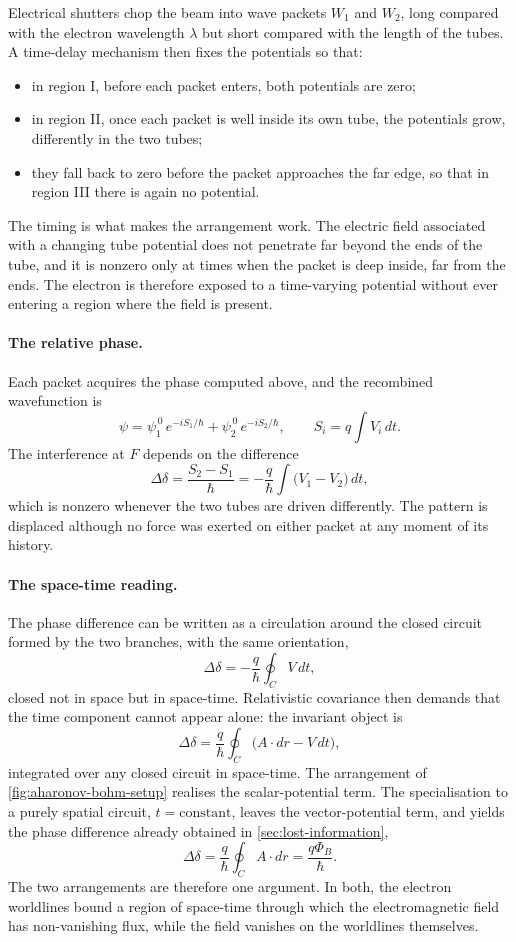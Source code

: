 Electrical shutters chop the beam into wave packets $W_1$ and $W_2$, long
compared with the electron wavelength $\lambda$ but short compared with the
length of the tubes. A time-delay mechanism then fixes the potentials so that:

\begin{itemize}
	\item in region I, before each packet enters, both potentials are zero;
	\item in region II, once each packet is well inside its own tube, the
	      potentials grow, differently in the two tubes;
	\item they fall back to zero before the packet approaches the far edge, so
	      that in region III there is again no potential.
\end{itemize}

The timing is what makes the arrangement work. The electric field associated
with a changing tube potential does not penetrate far beyond the ends of the
tube, and it is nonzero only at times when the packet is deep inside, far from
the ends. The electron is therefore exposed to a time-varying potential without
ever entering a region where the field is present.

\paragraph{The relative phase.}
Each packet acquires the phase computed above, and the recombined wavefunction
is
\[
	\psi = \psi_1^{\,0}\, e^{-iS_1/\hbar} + \psi_2^{\,0}\, e^{-iS_2/\hbar},
	\qquad
	S_i = q\!\int V_i \, dt .
\]
The interference at $F$ depends on the difference
\[
	\Delta\delta = \frac{S_2 - S_1}{\hbar}
	= -\frac{q}{\hbar}\int \bigl(V_1 - V_2\bigr)\, dt ,
\]
which is nonzero whenever the two tubes are driven differently. The pattern is
displaced although no force was exerted on either packet at any moment of its
history.

\paragraph{The space-time reading.}
The phase difference can be written as a circulation around the closed circuit
formed by the two branches, with the same orientation,
\[
	\Delta\delta = -\frac{q}{\hbar}\oint_C V\, dt ,
\]
closed not in space but in space-time. Relativistic covariance then demands that
the time component cannot appear alone: the invariant object is
\[
	\Delta\delta = \frac{q}{\hbar}\oint_C \bigl(A \cdot dr - V\, dt\bigr),
\]
integrated over any closed circuit in space-time. The arrangement of
\cref{fig:aharonov-bohm-setup} realises the scalar-potential term. The specialisation to a purely
spatial circuit, $t = \mathrm{constant}$, leaves the vector-potential term, and yields the
phase difference already obtained in \cref{sec:lost-information},
\[
	\Delta\delta = \frac{q}{\hbar}\oint_C A \cdot dr = \frac{q\Phi_B}{\hbar} .
\]
The two arrangements are therefore one argument. In both, the electron
worldlines bound a region of space-time through which the electromagnetic field
has non-vanishing flux, while the field vanishes on the worldlines themselves.


